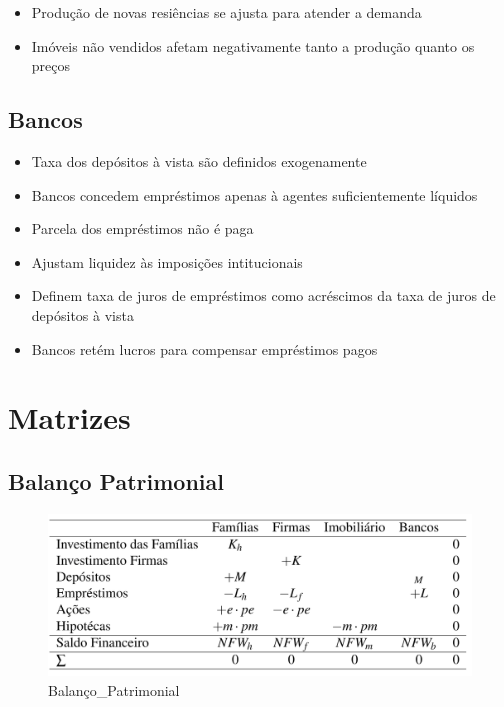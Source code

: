 \documentclass[11pt]{article}
\makeatletter
\def\maxwidth{\ifdim\Gin@nat@width>\linewidth\linewidth
    \else\Gin@nat@width\fi}
\let\Oldincludegraphics\includegraphics
\renewcommand{\includegraphics}[1]{\Oldincludegraphics[width=.8\maxwidth]{#1}}
\providecommand{\tightlist}{%
      \setlength{\itemsep}{0pt}\setlength{\parskip}{0pt}}
\makeatother
\begin{document}
\begin{itemize}
\tightlist
\item
  Produção de novas resiências se ajusta para atender a demanda
\item
  Imóveis não vendidos afetam negativamente tanto a produção quanto os
  preços
\end{itemize}

    \hypertarget{bancos}{%
\subsection{Bancos}\label{bancos}}

\begin{itemize}
\tightlist
\item
  Taxa dos depósitos à vista são definidos exogenamente
\item
  Bancos concedem empréstimos apenas à agentes suficientemente líquidos
\item
  Parcela dos empréstimos não é paga
\item
  Ajustam liquidez às imposições intitucionais
\item
  Definem taxa de juros de empréstimos como acréscimos da taxa de juros
  de depósitos à vista
\item
  Bancos retém lucros para compensar empréstimos pagos
\end{itemize}

    \hypertarget{matrizes}{%
\section{Matrizes}\label{matrizes}}

    \hypertarget{balanuxe7o-patrimonial}{%
\subsection{Balanço Patrimonial}\label{balanuxe7o-patrimonial}}

    \begin{figure}
\centering
\includegraphics{Patrimonial.png}
\caption{Balanço\_Patrimonial}
\end{figure}
\end{document}
